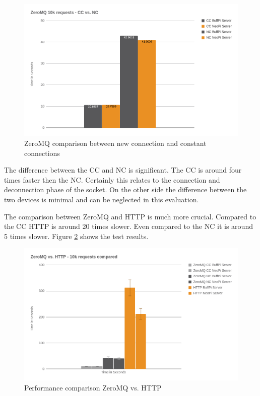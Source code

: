 \begin{figure}[H]
    \centering
    \includegraphics[width=\textwidth]{resources/images/performance_zeromq_cc_vs_nc.png}
    \caption[ZeroMQ comparison between new connection and constant connections]{ZeroMQ comparison between new connection and constant connections}
    \label{fig:performance_zeromq_cc_vs_nc}
\end{figure}

The difference between the \ac{CC} and \ac{NC} is significant.
The \ac{CC} is around four times faster then the \ac{NC}.
Certainly this relates to the connection and deconnection phase of the socket.
On the other side the difference between the two devices is minimal and can be neglected in this evaluation.

The comparison between ZeroMQ and \ac{HTTP} is much more crucial.
Compared to the \ac{CC} \ac{HTTP} is around 20 times slower.
Even compared to the \ac{NC} it is around 5 times slower.
Figure \ref{fig:performance_zeromq_vs_http} shows the test results.

\begin{figure}[H]
    \centering
    \includegraphics[width=\textwidth]{resources/images/performance_zeromq_vs_http.png}
    \caption[Performance comparison ZeroMQ vs. HTTP]{Performance comparison ZeroMQ vs. HTTP}
    \label{fig:performance_zeromq_vs_http}
\end{figure}

